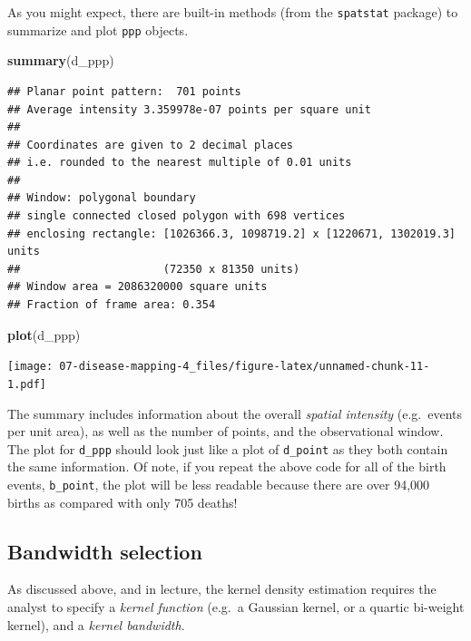 \documentclass[
]{book}
\newenvironment{Shaded}{\begin{snugshade}}{\end{snugshade}}
\newcommand{\FunctionTok}[1]{\textcolor[rgb]{0.13,0.29,0.53}{\textbf{#1}}}
\newcommand{\NormalTok}[1]{#1}
\begin{document}
As you might expect, there are built-in methods (from the \texttt{spatstat} package) to summarize and plot \texttt{ppp} objects.

\begin{Shaded}
\begin{Highlighting}[]
\FunctionTok{summary}\NormalTok{(d\_ppp)}
\end{Highlighting}
\end{Shaded}

\begin{verbatim}
## Planar point pattern:  701 points
## Average intensity 3.359978e-07 points per square unit
## 
## Coordinates are given to 2 decimal places
## i.e. rounded to the nearest multiple of 0.01 units
## 
## Window: polygonal boundary
## single connected closed polygon with 698 vertices
## enclosing rectangle: [1026366.3, 1098719.2] x [1220671, 1302019.3] units
##                      (72350 x 81350 units)
## Window area = 2086320000 square units
## Fraction of frame area: 0.354
\end{verbatim}

\begin{Shaded}
\begin{Highlighting}[]
\FunctionTok{plot}\NormalTok{(d\_ppp)}
\end{Highlighting}
\end{Shaded}

\texttt{[image: 07-disease-mapping-4\_files/figure-latex/unnamed-chunk-11-1.pdf]}

The summary includes information about the overall \emph{spatial intensity} (e.g.~events per unit area), as well as the number of points, and the observational window. The plot for \texttt{d\_ppp} should look just like a plot of \texttt{d\_point} as they both contain the same information. Of note, if you repeat the above code for all of the birth events, \texttt{b\_point}, the plot will be less readable because there are over 94,000 births as compared with only 705 deaths!

\hypertarget{bandwidth-selection}{%
\subsection{Bandwidth selection}\label{bandwidth-selection}}

As discussed above, and in lecture, the kernel density estimation requires the analyst to specify a \emph{kernel function} (e.g.~a Gaussian kernel, or a quartic bi-weight kernel), and a \emph{kernel bandwidth}.
\end{document}
